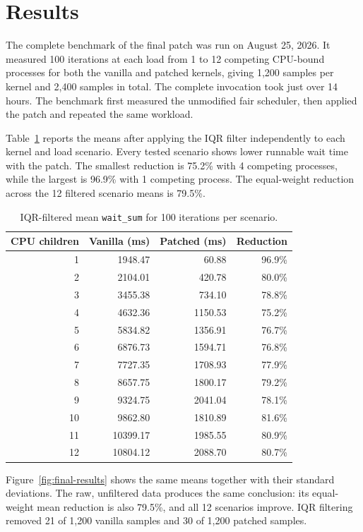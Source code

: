 \documentclass[11pt, a4paper]{article}
\begin{document}
\section{Results}

The complete benchmark of the final patch was run on August 25, 2026. It measured 100 iterations at each load from 1 to 12 competing CPU-bound processes for both the vanilla and patched kernels, giving 1,200 samples per kernel and 2,400 samples in total. The complete invocation took just over 14 hours. The benchmark first measured the unmodified fair scheduler, then applied the patch and repeated the same workload.

Table~\ref{tab:final-results} reports the means after applying the IQR filter independently to each kernel and load scenario. Every tested scenario shows lower runnable wait time with the patch. The smallest reduction is 75.2\% with 4 competing processes, while the largest is 96.9\% with 1 competing process. The equal-weight reduction across the 12 filtered scenario means is 79.5\%.

\begin{table}[H]
\centering
\small
\begin{tabular}{rrrr}
\toprule
CPU children & Vanilla (ms) & Patched (ms) & Reduction \\
\midrule
1  & 1948.47  & 60.88   & 96.9\% \\
2  & 2104.01  & 420.78  & 80.0\% \\
3  & 3455.38  & 734.10  & 78.8\% \\
4  & 4632.36  & 1150.53 & 75.2\% \\
5  & 5834.82  & 1356.91 & 76.7\% \\
6  & 6876.73  & 1594.71 & 76.8\% \\
7  & 7727.35  & 1708.93 & 77.9\% \\
8  & 8657.75  & 1800.17 & 79.2\% \\
9  & 9324.75  & 2041.04 & 78.1\% \\
10 & 9862.80  & 1810.89 & 81.6\% \\
11 & 10399.17 & 1985.55 & 80.9\% \\
12 & 10804.12 & 2088.70 & 80.7\% \\
\bottomrule
\end{tabular}
\caption{IQR-filtered mean \texttt{wait\_sum} for 100 iterations per scenario.}
\label{tab:final-results}
\end{table}

Figure~\ref{fig:final-results} shows the same means together with their standard deviations. The raw, unfiltered data produces the same conclusion: its equal-weight mean reduction is also 79.5\%, and all 12 scenarios improve. IQR filtering removed 21 of 1,200 vanilla samples and 30 of 1,200 patched samples.
\end{document}
